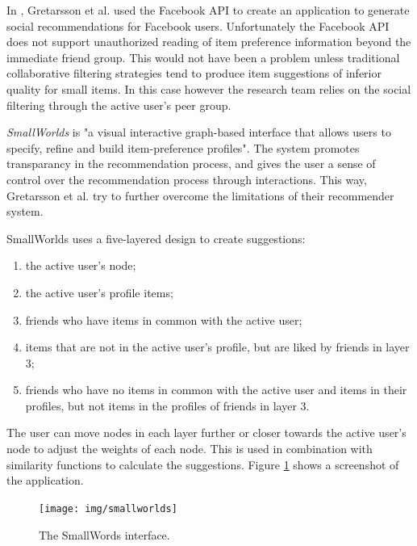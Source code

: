 In \cite{gretarsson:2010}, Gretarsson et al. used the Facebook API to create an application to generate social recommendations for Facebook users. Unfortunately the Facebook API does not support unauthorized reading of item preference information beyond the immediate friend group. This would not have been a problem unless traditional collaborative filtering strategies tend to produce item suggestions of inferior quality for small items. In this case however the research team relies on the social filtering through the active user's peer group\cite{gretarsson:2010}.

\emph{SmallWorlds} is "a visual interactive graph-based interface that allows users to specify, refine and build item-preference profiles"\cite{gretarsson:2010}. The system promotes transparancy in the recommendation process, and gives the user a sense of control over the recommendation process through interactions. This way, Gretarsson et al. try to further overcome the limitations of their recommender system\cite{gretarsson:2010}.

SmallWorlds uses a five-layered design to create suggestions:

\begin{enumerate}
	\item the active user's node;
	\item the active user's profile items;
	\item friends who have items in common with the active user;
	\item items that are not in the active user’s profile, but are liked by friends in layer $3$;
	\item friends who have no items in common with the active user and items in their profiles, but not items in the profiles of friends in layer $3$.
\end{enumerate}

The user can move nodes in each layer further or closer towards the active user's node to adjust the weights of each node. This is used in combination with similarity functions to calculate the suggestions. Figure \ref{figure:smallworlds} shows a screenshot of the application.

\begin{figure}%
	\begin{center}
		\texttt{[image: img/smallworlds]}%
	\end{center}
	\caption{The SmallWords interface.}%
	\label{figure:smallworlds}%
\end{figure}



